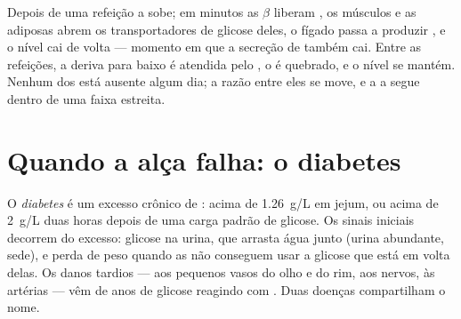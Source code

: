 \begin{example}\label{ex:g12:glucose-and-diabetes:loop}
Depois de uma refeição a  sobe; em minutos as  $\beta$
liberam , os músculos e as  adiposas abrem os
transportadores de glicose deles, o fígado passa a produzir ,
e o nível cai de volta --- momento em que a secreção de  também
cai. Entre as refeições, a deriva para baixo é atendida pelo ,
o  é quebrado, e o nível se mantém. Nenhum dos  está
ausente algum dia; a razão entre eles se move, e a  a segue
dentro de uma faixa estreita.
\end{example}

\section{Quando a alça falha: o diabetes}

\begin{definition}[Diabetes]\label{def:g12:glucose-and-diabetes:diabetes}
O \emph{diabetes} é um excesso crônico de :
acima de \qty{1.26}{g/L} em jejum, ou acima de \qty{2}{g/L} duas horas
depois de uma carga padrão de glicose. Os sinais iniciais decorrem do
excesso: glicose na urina, que arrasta água junto (urina abundante,
sede), e perda de peso quando as  não conseguem usar a glicose
que está em volta delas. Os danos tardios --- aos pequenos vasos do
olho e do rim, aos nervos, às artérias --- vêm de anos de glicose
reagindo com . Duas doenças compartilham o nome.
\end{definition}

